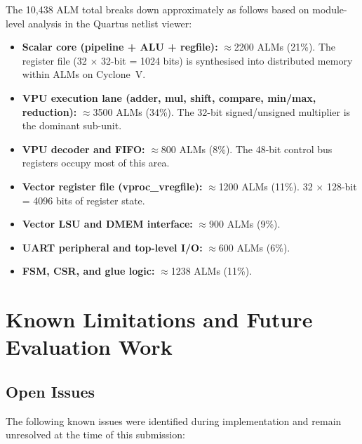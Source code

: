 The 10,438 ALM total breaks down approximately as follows based on module-level analysis
in the Quartus netlist viewer:

\begin{itemize}
  \item \textbf{Scalar core (pipeline + ALU + regfile):} $\approx$2200 ALMs (21\%).
        The register file (32 $\times$ 32-bit = 1024 bits) is synthesised into
        distributed memory within ALMs on Cyclone~V.
  \item \textbf{VPU execution lane (adder, mul, shift, compare, min/max, reduction):}
        $\approx$3500 ALMs (34\%). The 32-bit signed/unsigned multiplier is the
        dominant sub-unit.
  \item \textbf{VPU decoder and FIFO:} $\approx$800 ALMs (8\%). The 48-bit control bus
        registers occupy most of this area.
  \item \textbf{Vector register file (vproc\_vregfile):} $\approx$1200 ALMs (11\%).
        32 $\times$ 128-bit = 4096 bits of register state.
  \item \textbf{Vector LSU and DMEM interface:} $\approx$900 ALMs (9\%).
  \item \textbf{UART peripheral and top-level I/O:} $\approx$600 ALMs (6\%).
  \item \textbf{FSM, CSR, and glue logic:} $\approx$1238 ALMs (11\%).
\end{itemize}

\section{Known Limitations and Future Evaluation Work}
\label{sec:limitations}

\subsection{Open Issues}

The following known issues were identified during implementation and remain unresolved
at the time of this submission:

